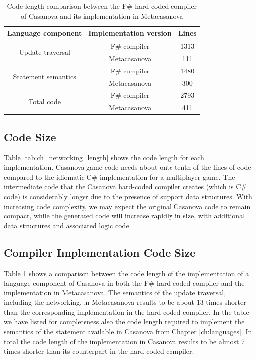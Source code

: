 \begin{table}
\centering
  \begin{tabular}{|c|c|c|}
    \hline
    Language component & Implementation version & Lines \\
    \hline
    \multirow{2}{*}{Update traversal}
    & F\# compiler & 1313 \\
    & Metacasanova & 111 \\
    \hline
    \multirow{2}{*}{Statement semantics}
    & F\# compiler & 1480 \\
    & Metacasanova & 300 \\
    \hline
    \multirow{2}{*}{Total code}
    & F\# compiler & 2793 \\
    & Metacasanova & 411 \\
    \hline
  \end{tabular}
  \caption{Code length comparison between the F\# hard-coded compiler of Casanova and its implementation in Metacasanova}
  \label{tab:ch_networking_compiler_length}
\end{table}

\subsection{Code Size}
Table \ref{tab:ch_networking_length} shows the code length for each implementation. Casanova game code needs about onte tenth of the lines of code compared to the idiomatic C\# implementation for a multiplayer game. The intermediate code that the Casanova hard-coded compiler creates (which is C\# code) is considerably longer due to the presence of support data structures. With increasing code complexity, we may expect the original Casanova code to remain compact, while the generated code will increase rapidly in size, with additional data structures and associated logic code.

\subsection{Compiler Implementation Code Size}
Table \ref{tab:ch_networking_compiler_length} shows a comparison between the code length of the implementation of a language component of Casanova in both the F\# hard-coded compiler and the implementation in Metacasanova. The semantics of the update traversal, including the networking, in Metacasanova results to be about 13 times shorter than the corresponding implementation in the hard-coded compiler. In the table we have listed for completeness also the code length required to implement the semantics of the statement available in Casanova from Chapter \ref{ch:languages}. In total the code length of the implementation in Casanova results to be almost 7 times shorter than its counterpart in the hard-coded compiler.

